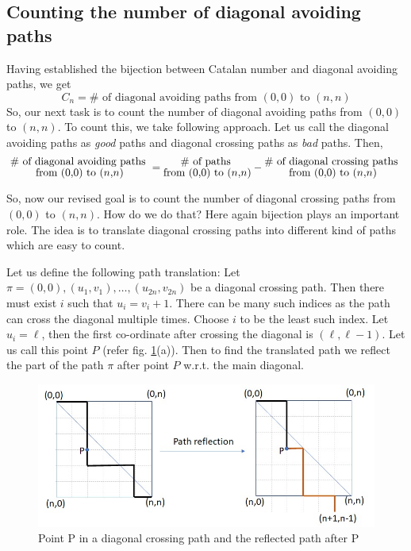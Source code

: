 
\subsection{Counting the number of diagonal avoiding paths} 
Having established the bijection between Catalan number and diagonal avoiding paths, we get  
\begin{equation}
\label{eq:catalan-expr-1}
    C_n = \# \text{ of diagonal avoiding paths from $(0,0)$ to $(n,n)$}
\end{equation}
So, our next task is to count the number of diagonal avoiding paths from $(0,0)$ to $(n,n)$. 
To count this, we take following approach. Let us call the diagonal avoiding paths as \textit{good} paths and diagonal crossing paths as \textit{bad} paths. Then,
\begin{equation}
\label{eq:no-of-good-paths}
\Large
    \substack{\text{\# of diagonal avoiding paths }\\ \text{from } (0,0) \text{ to } (n,n)}  = \substack{\text{\# of paths }\\ \text{from } (0,0) \text{ to } (n,n)} - \substack{\text{\# of diagonal crossing paths }\\ \text{from } (0,0) \text{ to } (n,n)}
\end{equation}  

So, now our revised goal is to count the number of diagonal crossing paths from $(0,0)$ to $(n,n)$. How do we do that? Here again bijection plays an important role. The idea is to translate diagonal crossing paths into  different kind of paths which are easy to count. 

Let us define the following path translation:  Let $\pi=(0,0), (u_1,v_1), \ldots, (u_{2n}, v_{2n})$ be  a diagonal crossing path. Then there must exist $i$ such that $u_i = v_i+1$. There can be many such indices as the path can cross the diagonal multiple times. Choose $i$ to be the least such index. Let $u_i = \ell$, then the first co-ordinate after crossing the diagonal is $(\ell, \ell-1)$. Let us call this point $P$ (refer fig. \ref{fig:reflecting-path}(a)). Then to find the translated path we reflect the part of the path $\pi$ after point $P$ w.r.t. the main diagonal. 

\begin{figure}[h!]
    \centering
    \includegraphics[width=0.7\linewidth]{images/reflecting-path.jpeg}
    \caption{Point P in a diagonal crossing path and the reflected path after P}
    \label{fig:reflecting-path}
\end{figure}

